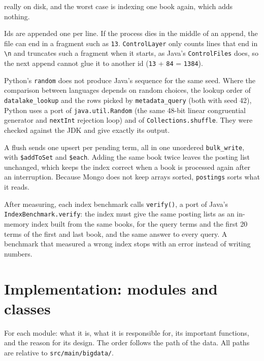 \documentclass[11pt,a4paper]{article}
\newcommand{\code}[1]{\texttt{#1}}
\begin{document}
\begin{description}[style=nextline,leftmargin=0pt,itemsep=6pt]
        really on disk, and the worst case is indexing one book again, which adds nothing.
  \item[A control layer that trims a half-written line.] Ids are appended one per line. If the
        process dies in the middle of an append, the file can end in a fragment such as \code{13}.
        \code{ControlLayer} only counts lines that end in \code{\textbackslash n} and truncates such a
        fragment when it starts, as Java's \code{ControlFiles} does, so the next append cannot glue
        it to another id (\code{13} + \code{84} = \code{1384}).
  \item[\code{JavaRandom} and \code{java\_shuffle}.] Python's \code{random} does not produce Java's
        sequence for the same seed. Where the comparison between languages depends on random
        choices, the lookup order of \code{datalake\_lookup} and the rows picked by
        \code{metadata\_query} (both with seed 42), Python uses a port of \code{java.util.Random}
        (the same 48-bit linear congruential generator and \code{nextInt} rejection loop) and of
        \code{Collections.shuffle}. They were checked against the JDK and give exactly its output.
  \item[\code{\$addToSet} in MongoDB.] A flush sends one upsert per pending term, all in one
        unordered \code{bulk\_write}, with \code{\$addToSet} and \code{\$each}. Adding the same book
        twice leaves the posting list unchanged, which keeps the index correct when a book is
        processed again after an interruption. Because Mongo does not keep arrays sorted,
        \code{postings} sorts what it reads.
  \item[Check every index against an in-memory one.] After measuring, each index benchmark calls
        \code{verify()}, a port of Java's \code{IndexBenchmark.verify}: the index must give the same
        posting lists as an in-memory index built from the same books, for the query terms and the
        first 20 terms of the first and last book, and the same answer to every query. A benchmark
        that measured a wrong index stops with an error instead of writing numbers.
\end{description}

\section{Implementation: modules and classes}
For each module: what it is, what it is responsible for, its important functions, and the reason
for its design. The order follows the path of the data. All paths are relative to
\code{src/main/bigdata/}.
\end{document}
